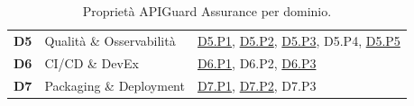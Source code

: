 \begin{table}[ht]
\begin{tabular}{@{} l l >{\raggedright\arraybackslash}p{22em} @{}}
    \addlinespace
    \textbf{D5}                             & Qualità \& Osservabilità        &
    \hyperref[subsec:traceability]{D5.P1}, \hyperref[subsec:traceability]{D5.P2}, \hyperref[subsec:payload-catalog]{D5.P3}, D5.P4, \hyperref[subsec:dual-audit-trail]{D5.P5}                                                                                                                                                                                                                 \\
    \addlinespace
    \textbf{D6}                             & CI/CD \& DevEx                  &
    \hyperref[subsec:exit-codes]{D6.P1}, D6.P2, \hyperref[subsec:dual-layer-type-safety]{D6.P3}                                                                                                                                                                                                                                                                                              \\
    \addlinespace
    \textbf{D7}                             & Packaging \& Deployment         &
    \hyperref[subsec:connector-hierarchy]{D7.P1}, \hyperref[subsec:agpl-isolation]{D7.P2}, D7.P3                                                                                                                                                                                                                                                                                             \\
    \bottomrule
  \end{tabular}
  \caption{Proprietà APIGuard Assurance per dominio.}
  \label{tab:property-index}
\end{table}